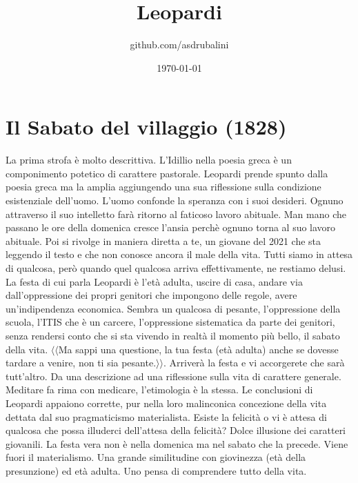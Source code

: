 \documentclass{article}
\title{Leopardi}
\author{github.com/asdrubalini}
\date{\today}
\begin{document}
    \maketitle

    \section{Il Sabato del villaggio (1828)}
    La prima strofa è molto descrittiva.
    L'Idillio nella poesia greca è un componimento potetico di carattere pastorale.
    Leopardi prende spunto dalla poesia greca ma la amplia aggiungendo una sua riflessione sulla condizione esistenziale dell'uomo.
    \newline
    L'uomo confonde la speranza con i suoi desideri. Ognuno attraverso il suo intelletto farà ritorno al faticoso lavoro abituale.
    Man mano che passano le ore della domenica cresce l'ansia perchè ognuno torna al suo lavoro abituale. Poi si rivolge in maniera diretta
    a te, un giovane del 2021 che sta leggendo il testo e che non conosce ancora il male della vita. Tutti siamo in attesa di qualcosa, però
    quando quel qualcosa arriva effettivamente, ne restiamo delusi.
    La festa di cui parla Leopardi è l'età adulta, uscire di casa, andare via dall'oppressione dei propri genitori che impongono delle regole,
    avere un'indipendenza economica.
    \newline*
    Sembra un qualcosa di pesante, l'oppressione della scuola, l'ITIS che è un carcere, l'oppressione sistematica da parte dei genitori, senza
    rendersi conto che si sta vivendo in realtà il momento più bello, il sabato della vita. $\langle \langle$Ma sappi una questione, la tua festa (età adulta)
    anche se dovesse tardare a venire, non ti sia pesante.$\rangle \rangle$. Arriverà la festa e vi accorgerete che sarà tutt'altro.
    Da una descrizione ad una riflessione sulla vita di carattere generale.
    \newline
    Meditare fa rima con medicare, l'etimologia è la stessa. Le conclusioni di Leopardi appaiono corrette, pur nella loro malinconica concezione
    della vita dettata dal suo pragmaticismo materialista.
    \newline
    Esiste la felicità o vi è attesa di qualcosa che possa illuderci dell'attesa della felicità?
    Dolce illusione dei caratteri giovanili. La festa vera non è nella domenica ma nel sabato che la precede. Viene fuori il materialismo.
    Una grande similitudine con giovinezza (età della presunzione) ed età adulta. Uno pensa di comprendere tutto della vita.
\end{document}
